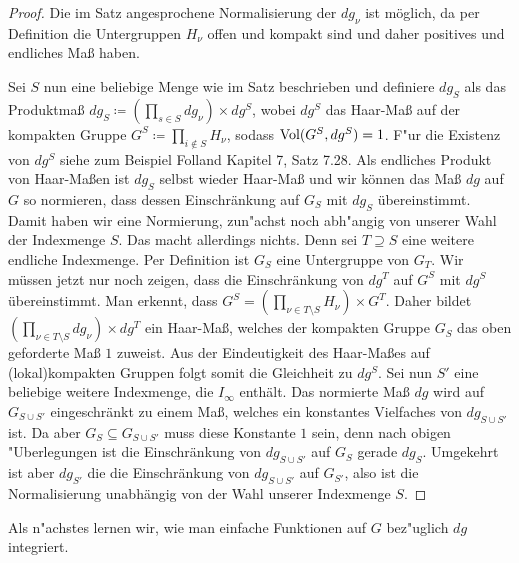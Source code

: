 		\begin{proof}
			Die im Satz angesprochene Normalisierung der $dg_\nu$ ist möglich, da per Definition die Untergruppen $H_\nu$ offen und kompakt sind und daher positives und endliches Maß haben.
			
			Sei $S$ nun eine beliebige Menge wie im Satz beschrieben und definiere $dg_S$ als das Produktmaß $dg_S \coloneqq \left(\prod_{s \in S}dg_\nu\right) \times dg^S$, wobei $dg^S$ das Haar-Maß auf der kompakten Gruppe $G^S\coloneqq \prod_{i \notin S} H_\nu$, sodass $\text{Vol}(G^S, dg^S) = 1$. 
			F"ur die Existenz von $dg^S$ siehe zum Beispiel Folland \cite{folland} Kapitel 7, Satz 7.28. 
			Als endliches Produkt von Haar-Maßen ist $dg_S$ selbst wieder Haar-Maß und wir können das Maß $dg$ auf $G$ so normieren, dass dessen Einschränkung auf $G_S$ mit $dg_S$ übereinstimmt.
			Damit haben wir eine Normierung, zun"achst noch abh"angig von unserer Wahl der Indexmenge $S$.
			Das macht allerdings nichts.
			Denn sei $T\supseteq S$ eine weitere endliche Indexmenge. 
			Per Definition ist $G_S$ eine Untergruppe von $G_T$. 
			Wir müssen jetzt nur noch zeigen, dass die Einschränkung von $dg^T$ auf $G^S$ mit $dg^S$ übereinstimmt.
			Man erkennt, dass $G^S = \left(\prod_{\nu\in T \setminus S} H_\nu\right) \times G^T$.
			Daher bildet $\left(\prod_{\nu\in T \setminus S} dg_\nu\right) \times dg^T$ ein Haar-Maß, welches der kompakten Gruppe $G_S$ das oben geforderte Maß $1$ zuweist.
			Aus der Eindeutigkeit des Haar-Maßes auf (lokal)kompakten Gruppen folgt somit die Gleichheit zu $dg^S$.
			Sei nun $S'$ eine beliebige weitere Indexmenge, die $I_\infty$ enthält. 
			Das normierte Maß $dg$ wird auf $G_{S\cup S'}$ eingeschränkt zu einem Maß, welches ein konstantes Vielfaches von $dg_{S\cup S'}$ ist. 
			Da aber $G_S \subseteq G_{S\cup S'}$ muss diese Konstante $1$ sein, denn nach obigen "Uberlegungen ist die Einschränkung von $dg_{S\cup S'}$ auf $G_S$ gerade $dg_{S}$.
			Umgekehrt ist aber $dg_{S'}$ die die Einschränkung von $dg_{S\cup S'}$ auf $G_{S'}$, also ist die Normalisierung unabhängig von der Wahl unserer Indexmenge $S$.
		\end{proof}
		Als n"achstes lernen wir, wie man einfache Funktionen auf $G$ bez"uglich $dg$ integriert.
